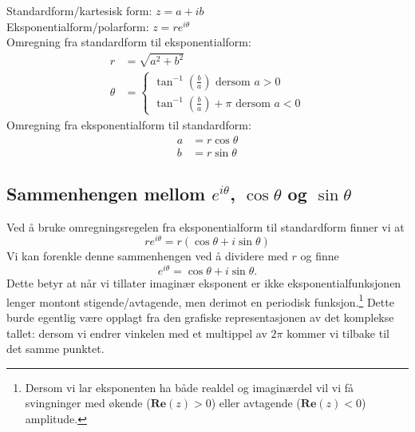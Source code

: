 \documentclass[a4paper,norsk,12pt]{article}
\begin{document}
\begin{tsummary}
Standardform/kartesisk form: $z = a + ib$ \\
Eksponentialform/polarform: $z = re^{i\theta}$ \\[12pt]

Omregning fra standardform til eksponentialform:
\begin{align*}
	r &= \sqrt{a^2+b^2} \\
	\theta &= \begin{cases}
		\tan^{-1}\left(\frac{b}{a}\right) \text{ dersom } a>0 \\
		\tan^{-1}\left(\frac{b}{a}\right)+\pi \text{ dersom } a <0
	\end{cases}
\end{align*}
Omregning fra eksponentialform til standardform:
\begin{align*}
	a &= r\cos\theta \\
	b &= r\sin\theta
\end{align*}
\end{tsummary}

\subsection{Sammenhengen mellom $e^{i\theta}$, $\cos\theta$ og $\sin\theta$}
Ved å bruke omregningsregelen fra eksponentialform til standardform finner vi at
\begin{displaymath}
	re^{i\theta} = r(\cos\theta + i\sin\theta)
\end{displaymath}
Vi kan forenkle denne sammenhengen ved å dividere med $r$ og finne
\begin{equation}
	\label{kompleks:eq:eitheta}
	e^{i\theta} = \cos\theta + i\sin\theta.
\end{equation}
Dette betyr at når vi tillater imaginær eksponent er ikke eksponentialfunksjonen lenger montont stigende/avtagende, men derimot en periodisk funksjon.\footnote{Dersom vi lar eksponenten ha både realdel og imaginærdel vil vi få svingninger med økende ($\mathbf{Re}(z)>0$) eller avtagende ($\mathbf{Re}(z)<0$) amplitude.} Dette burde egentlig være opplagt fra den grafiske representasjonen av det komplekse tallet: dersom vi endrer vinkelen med et multippel av $2\pi$ kommer vi tilbake til det samme punktet.
\end{document}
